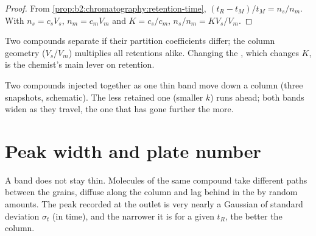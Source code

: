 \begin{proof}
From \cref{prop:b2:chromatography:retention-time}, $(t_R - t_M)/t_M = n_s/n_m$. With $n_s = c_sV_s$,
$n_m = c_mV_m$ and $K = c_s/c_m$, $n_s/n_m = KV_s/V_m$.
\end{proof}

Two compounds separate if their partition coefficients differ; the column geometry ($V_s/V_m$)
multiplies all retentions alike. Changing the , which changes $K$, is the chemist's main
lever on retention.

\begin{omfigure}
\par\vspace{4pt}

{\small Two compounds injected together as one thin band move down a column (three snapshots,
schematic). The less retained one (smaller $k$) runs ahead; both bands widen as they travel, the one
that has gone further the more.}
\end{omfigure}

\section{Peak width and plate number}

A band does not stay thin. Molecules of the same compound take different paths between the grains,
diffuse along the column and lag behind in the  by random amounts. The peak recorded at
the outlet is very nearly a Gaussian of standard deviation $\sigma_t$ (in time), and the narrower it is
for a given $t_R$, the better the column.

